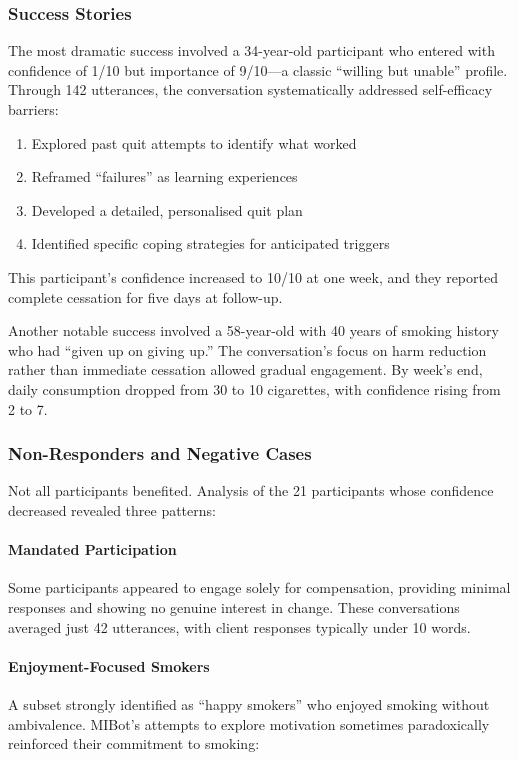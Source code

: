 \subsubsection{Success Stories}

The most dramatic success involved a 34-year-old participant who entered with confidence of 1/10 but importance of 9/10---a classic ``willing but unable'' profile. Through 142 utterances, the conversation systematically addressed self-efficacy barriers:

\begin{enumerate}
\item Explored past quit attempts to identify what worked
\item Reframed ``failures'' as learning experiences
\item Developed a detailed, personalised quit plan
\item Identified specific coping strategies for anticipated triggers
\end{enumerate}

This participant's confidence increased to 10/10 at one week, and they reported complete cessation for five days at follow-up.

Another notable success involved a 58-year-old with 40 years of smoking history who had ``given up on giving up.'' The conversation's focus on harm reduction rather than immediate cessation allowed gradual engagement. By week's end, daily consumption dropped from 30 to 10 cigarettes, with confidence rising from 2 to 7.

\subsubsection{Non-Responders and Negative Cases}

Not all participants benefited. Analysis of the 21 participants whose confidence decreased revealed three patterns:

\paragraph{Mandated Participation}
Some participants appeared to engage solely for compensation, providing minimal responses and showing no genuine interest in change. These conversations averaged just 42 utterances, with client responses typically under 10 words.

\paragraph{Enjoyment-Focused Smokers}
A subset strongly identified as ``happy smokers'' who enjoyed smoking without ambivalence. MIBot's attempts to explore motivation sometimes paradoxically reinforced their commitment to smoking:

